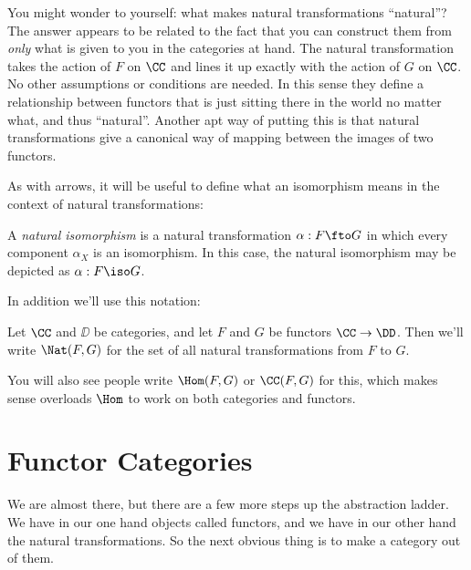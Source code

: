 You might wonder to yourself: what makes natural transformations ``natural''? The answer
appears to be related to the fact that you can construct them from {\it only} what is
given to you in the categories at hand. The natural transformation takes the action of $F$
on $\CC$ and lines it up exactly with the action of $G$ on $\CC$. No other assumptions or
conditions are needed. In this sense they define a relationship between functors that is
just sitting there in the world no matter what, and thus ``natural''. Another apt way of
putting this is that natural transformations give a canonical way of mapping between the
images of two functors.

As with arrows, it will be useful to define what an isomorphism means in the context of
natural transformations:

\begin{defn}
A {\it natural isomorphism} is a natural transformation $\alpha: F \fto G$ in which every
component $\alpha_X$ is an isomorphism. In this case, the natural isomorphism may be
depicted as $\alpha: F \iso G$.
\end{defn}
\goodbreak
\noindent
In addition we'll use this notation:

\begin{defn}
Let $\CC$ and $\DD$ be categories, and let $F$ and $G$ be functors $\CC \to \DD$. Then we'll write $\Nat(F, G)$ 
for the set of all natural transformations from $F$ to $G$.
\end{defn}
\noindent
You will also see people write $\Hom(F, G)$ or $\CC(F, G)$ for this, which makes sense overloads $\Hom$
to work on both categories and functors.

\section{Functor Categories}

We are almost there, but there are a few more steps up the abstraction ladder. We
have in our one hand objects called functors, and we have in our other hand the natural
transformations. So the next obvious thing is to make a category out of them.

